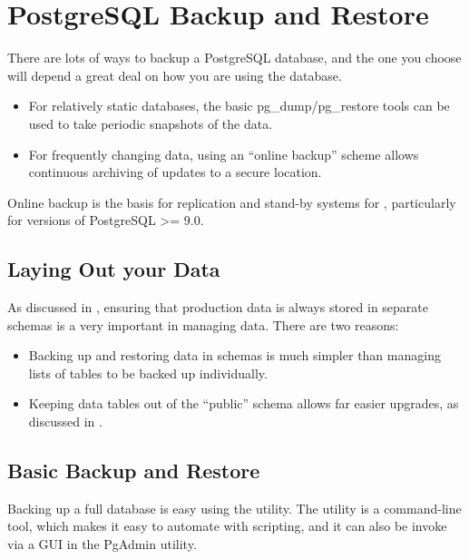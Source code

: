 \documentclass[a4paper,11pt,english]{sphinxmanual}
\begin{document}
\section{PostgreSQL Backup and Restore}
\label{\detokenize{maintenance:postgresql-backup-and-restore}}\label{\detokenize{maintenance:backup}}
There are lots of ways to backup a PostgreSQL database, and the one you choose will depend a great deal on how you are using the database.
\begin{itemize}
\item {} 
For relatively static databases, the basic pg\_dump/pg\_restore tools can be used to take periodic snapshots of the data.

\item {} 
For frequently changing data, using an “online backup” scheme allows continuous archiving of updates to a secure location.

\end{itemize}

Online backup is the basis for replication and stand-by systems for , particularly for versions of PostgreSQL \textgreater{}= 9.0.


\subsection{Laying Out your Data}
\label{\detokenize{maintenance:laying-out-your-data}}
As discussed in , ensuring that production data is always stored in separate schemas is a very important  in managing data. There are two reasons:
\begin{itemize}
\item {} 
Backing up and restoring data in schemas is much simpler than managing lists of tables to be backed up individually.

\item {} 
Keeping data tables out of the “public” schema allows far easier upgrades, as discussed in .

\end{itemize}


\subsection{Basic Backup and Restore}
\label{\detokenize{maintenance:basic-backup-and-restore}}
Backing up a full database is easy using the  utility. The utility is a command-line tool, which makes it easy to automate with scripting, and it can also be invoke via a GUI in the PgAdmin utility.
\end{document}
